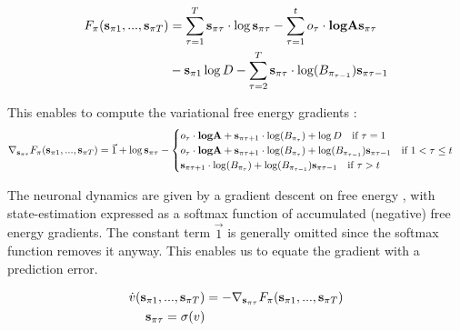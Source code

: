 \documentclass{article}
\begin{document}
\begin{equation}
    \begin{split}
        F_\pi(\bold s_{\pi 1},...,\bold s_{\pi T}) &= \sum_{\tau = 1}^T \bold s_{\pi \tau } \cdot \log \bold s_{\pi \tau } 
        - \sum_{\tau = 1}^t o_\tau \cdot \textbf{log} \bold A \bold s_{\pi \tau }\\
        &- \bold s_{\pi 1 } \log D- \sum_{\tau = 2}^T \bold s_{\pi \tau } \cdot \log (B_{\pi_{\tau-1}})\bold s_{\pi \tau-1 }
    \end{split}
\end{equation}

This enables to compute the variational free energy gradients \cite{petersenMatrixCookbook}:
\begin{equation}
    \label{eq:vfe gradients perception}
    \begin{split}
        \nabla_{\bold s_{\pi\tau}} F_\pi(\bold s_{\pi 1},...,\bold s_{\pi T}) = \vec {1} +\log  \bold s_{\pi\tau} -
        \begin{cases}
             o_\tau \cdot \textbf{log} \bold A+ \bold s_{\pi\tau+1} \cdot \log (B_{\pi_{\tau}}) + \log D \quad  \text{if } \tau = 1 \\
            o_\tau \cdot \textbf{log} \bold A+ \bold s_{\pi\tau+1} \cdot \log (B_{\pi_{\tau}}) +\log (B_{\pi_{\tau-1}}) \bold s_{\pi\tau-1} \quad \text{if } 1<\tau \leq t  \\
             \bold s_{\pi\tau+1} \cdot \log (B_{\pi_{\tau}}) +\log (B_{\pi_{\tau-1}}) \bold s_{\pi\tau-1} \quad \text{if }  \tau > t
        \end{cases}
    \end{split}
\end{equation}

The neuronal dynamics are given by a gradient descent on free energy \cite{fristonActiveInferenceProcess2017}, with state-estimation expressed as a softmax function of accumulated (negative) free energy gradients. The constant term $\vec{1}$ is generally omitted since the softmax function removes it anyway. This enables us to equate the gradient with a prediction error.

  	\begin{equation}
  	\label{eq: perceptual dynamics}
  	    \begin{split}
  	        \dot v (\bold s_{\pi 1},...,\bold s_{\pi T})&=-\nabla_{\bold s_{\pi\tau}} F_\pi(\bold s_{\pi 1},...,\bold s_{\pi T}) \\
  	        \bold s_{\pi\tau} = \sigma (v)
  	    \end{split}
  	\end{equation}
  	
\end{document}
